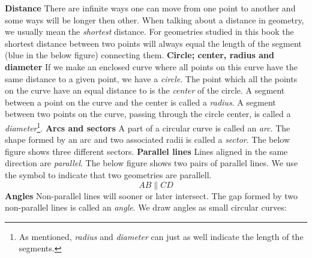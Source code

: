 \newpage
{}
\newpage
\textbf{Distance}\os
There are infinite ways one can move from one point to another and some ways will be longer then other. When talking about a distance in geometry, we usually mean the \textsl{shortest} distance. For geometries studied in this book the shortest distance between two points will always equal the length of the segment (blue in the below figure) connecting them.
\textbf{Circle; center, radius and diameter} \os
If we make an enclosed curve where all points on this curve have the same distance to a given point, we have a \textit{circle}. The point which all the points on the curve have an equal distance to is the \textit{center} of the circle. A segment between a point on the curve and the center is called a \textit{radius}. A segment between two points on the curve, passing through the circle center, is called a \textit{diameter}\footnote{As mentioned, \textit{radius} and \textit{diameter} can just as well indicate the length of the segments.}.
\textbf{Arcs and sectors} \os
A part of a circular curve is called an \textit{arc}. The shape formed by an arc and two associated radii is called a \textit{sector}. The below figure shows three different sectors.
\newpage
\textbf{Parallel lines}\os
Lines aligned in the same direction are \textit{parallel}. The below figure shows two pairs of parallel lines.
We use the symbol \sym{$ \parallel $} to indicate that two geometries are parallell.
\[ AB\parallel CD \]
\textbf{Angles} \label{vinklar}\os
Non-parallel lines will sooner or later intersect. The gap formed  by two non-parallel lines is called an \textit{angle}. We draw angles as small circular curves:
